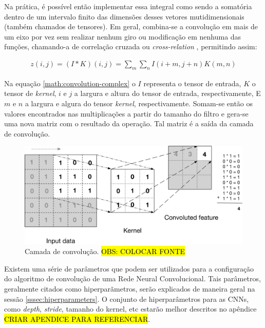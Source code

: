 Na prática, é possível então implementar essa integral como sendo a somatória dentro de um intervalo finito das dimensões desses vetores mutidimensionais (também chamados de tensores). Em geral, combina-se a convolução em mais de um eixo por vez sem realizar nenhum giro ou modificação em nenhuma das funções, chamando-a de correlação cruzada ou \textit{cross-relation} \cite{goodfellow-et-al-2016}, permitindo assim:

\begin{gather}
  z(i, j) = (I * K)(i, j) = \sum_{m} \sum_{n} I(i + m, j + n)K(m,n)
  \label{math:convolution-complex}
\end{gather}

Na equação \ref{math:convolution-complex} o \(I\) representa o tensor de entrada, \(K\) o tensor de \textit{kernel}, \(i\) e \(j\) a largura e altura do tensor de entrada, respectivamente, E \(m\) e \(n\) a largura e algura do tensor \textit{kernel}, respectivamente. Somam-se então os valores encontrados nas multiplicações a partir do tamanho do filtro e gera-se uma nova matriz com o resultado da operação. Tal matriz é a saída da camada de convolução.

\begin{figure}[H]
  \includegraphics[width=\linewidth]{figuras/cnn-kernel-multiplication.png}
  \caption{Camada de convolução. \hl{OBS: COLOCAR FONTE}}
  \label{fig:cnn-kernel-multiplication}
\end{figure}

Existem uma série de parâmetros que podem ser utilizados para a configuração do algoritmo de convolução de uma Rede Neural Convolucional. Tais parâmetros, geralmente citados como hiperparãmetros, serão explicados de maneira geral na sessão \ref{sssec:hiperparameters}. O conjunto de hiperparâmetros para as CNNs, como \textit{depth}, \textit{stride}, tamanho do kernel, etc estarão melhor descritos no apêndice \hl{CRIAR APENDICE PARA REFERENCIAR}.

